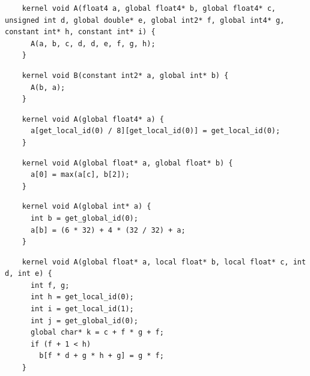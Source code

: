 \newsavebox{\NvidiaRecursionSegfault}
\begin{lrbox}{\NvidiaRecursionSegfault}
  \hspace{1.5em}
  \begin{lstlisting}
    kernel void A(float4 a, global float4* b, global float4* c, unsigned int d, global double* e, global int2* f, global int4* g, constant int* h, constant int* i) {
      A(a, b, c, d, d, e, f, g, h);
    }
  \end{lstlisting}
\end{lrbox}
%
\newsavebox{\NvidiaRecursionSegfaultReduced}
\begin{lrbox}{\NvidiaRecursionSegfaultReduced}
  \hspace{1.5em}
  \begin{lstlisting}
    kernel void B(constant int2* a, global int* b) {
      A(b, a);
    }
  \end{lstlisting}
\end{lrbox}

\newsavebox{\BeignetScalarizeInsert}
\begin{lrbox}{\BeignetScalarizeInsert}
  \hspace{1.5em}
  \begin{lstlisting}
    kernel void A(global float4* a) {
      a[get_local_id(0) / 8][get_local_id(0)] = get_local_id(0);
    }
  \end{lstlisting}
\end{lrbox}

\newsavebox{\OclgrindUncorrectedTypos}
\begin{lrbox}{\OclgrindUncorrectedTypos}
  \hspace{1.5em}
  \begin{lstlisting}
    kernel void A(global float* a, global float* b) {
      a[0] = max(a[c], b[2]);
    }
  \end{lstlisting}
\end{lrbox}

\newsavebox{\BeignetPtrIntSpin}
\begin{lrbox}{\BeignetPtrIntSpin}
  \hspace{1.5em}
  \begin{lstlisting}
    kernel void A(global int* a) {
      int b = get_global_id(0);
      a[b] = (6 * 32) + 4 * (32 / 32) + a;
    }
  \end{lstlisting}
\end{lrbox}

\newsavebox{\NvidiaCompileSegfault}
\begin{lrbox}{\NvidiaCompileSegfault}
  \hspace{1.5em}
  \begin{lstlisting}
    kernel void A(global float* a, local float* b, local float* c, int d, int e) {
      int f, g;
      int h = get_local_id(0);
      int i = get_local_id(1);
      int j = get_global_id(0);
      global char* k = c + f * g + f;
      if (f + 1 < h)
        b[f * d + g * h + g] = g * f;
    }
  \end{lstlisting}
\end{lrbox}

